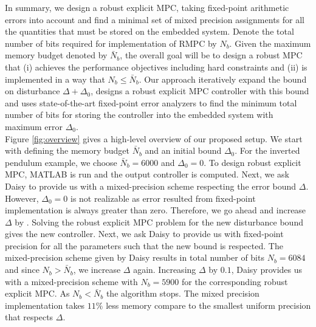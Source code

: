 	In summary, we design a robust explicit MPC, taking fixed-point arithmetic errors into account and find a minimal set of mixed precision assignments for all the quantities that must be stored on the embedded system. Denote the total number of bits required for implementation of RMPC by $N_b$. Given the maximum memory budget denoted by $\bar N_b$, the overall goal will be to design a robust MPC that (i) achieves the performance objectives including hard constraints and (ii) is implemented in a way that $N_b\leq \bar N_b$.
	Our approach iteratively expand the bound on disturbance $\Delta+\Delta_0$, designs a robust explicit MPC controller with this bound and uses state-of-the-art fixed-point error analyzers to find the minimum total number of bits for storing the controller into the embedded system with maximum error $\Delta_0$.\\
	
	Figure \ref{fig:overview} gives a high-level overview of our proposed setup. We start with defining the memory budget $\bar N_b$ and an initial bound $\Delta_0$. For the inverted pendulum example, we choose $\bar N_b=6000$ and $\Delta_0=0$. To design robust explicit MPC, MATLAB is run and the output controller is computed. Next, we ask Daisy to provide us with a mixed-precision scheme respecting the error bound $\Delta$. However, $\Delta_0=0$ is not realizable as error resulted from fixed-point implementation is always greater than zero. Therefore, we go ahead and increase $\Delta$ by .  Solving the robust explicit MPC problem for the new disturbance bound gives the new controller. Next, we ask Daisy to provide us with fixed-point precision for all the parameters such that the new bound is respected. The mixed-precision scheme given by Daisy results in total number of bits $N_b=6084$ and since $N_b>\bar N_b$, we increase $\Delta$ again. Increasing $\Delta$ by $0.1$, Daisy provides us with a mixed-precision scheme with $N_b=5900$ for the corresponding robust explicit MPC. As $N_b<\bar N_b$ the algorithm stops. The mixed precision implementation takes $11\%$ less memory compare to the smallest uniform precision that respects $\Delta$. 
	
	
	
